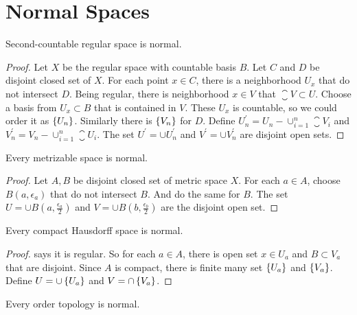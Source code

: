 
\section{Normal Spaces}

\begin{theorem}
    Second-countable regular space is normal.    
\end{theorem}
\begin{proof}
    Let $X$ be the regular space with countable basis $B$. Let $C$ and $D$ be disjoint closed set of $X$. For each point $x \in C$, there is a neighborhood $U_x$ that do not intersect $D$. Being regular, there is neighborhood $x \in V$ that $\closure{V} \subset U$. Choose a basis from $U_x \subset B$ that is contained in $V$. These $U_x$ is countable, so we could order it as $\set{U_n}$. Similarly there is $\set{V_n}$ for $D$. Define $U_n^{'} = U_n - \cup_{i=1}^n \closure{V_i}$ and $V_n^{'} = V_n - \cup_{i=1}^n \closure{U_i}$. The set $U^{'} = \cup U_n^{'}$ and $V^{'} = \cup V_n^{'}$ are disjoint open sets.
\end{proof}

\begin{theorem}
    Every metrizable space is normal.    
\end{theorem}
\begin{proof}
    Let $A,B$ be disjoint closed set of metric space $X$. For each $a \in A$, choose $B(a, \epsilon_a)$ that do not intersect $B$. And do the same for $B$. The set $U = \cup B(a, \frac{\epsilon_a}{2})$ and $V = \cup B(b, \frac{\epsilon_b}{2})$ are the disjoint open set. 
\end{proof}

\begin{theorem}
    Every compact Hausdorff space is normal.    
\end{theorem}
\begin{proof}
     says it is regular. So for each $a \in A$, there is open set $x \in U_a$ and $B \subset V_a$ that are disjoint. Since $A$ is compact, there is finite many set $\set{U_a}$ and $\set{V_a}$. Define $U = \cup \set{U_a}$ and $V = \cap \set{V_a}$.
\end{proof}

\begin{theorem}
    Every order topology is normal.    
\end{theorem}


